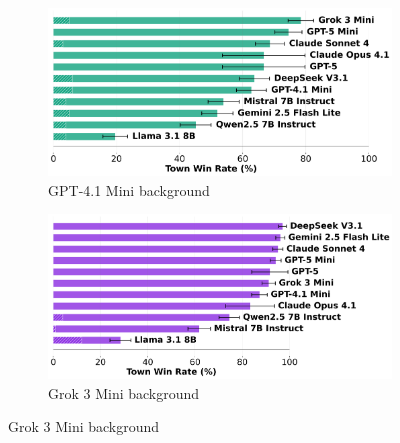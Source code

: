 \documentclass{article}
\begin{document}
\begin{figure}[htbp]
    \centering
    \begin{subfigure}[b]{0.48\textwidth}
        \centering
        \includegraphics[width=\textwidth]{../results/detective_gpt-4.1_mini_db_benchmark.png}
        \caption{GPT-4.1 Mini background}
        \label{fig:detective_gpt41mini_appendix}
    \end{subfigure}
    \hfill
    \begin{subfigure}[b]{0.48\textwidth}
        \centering
        \includegraphics[width=\textwidth]{../results/detective_grok_3_mini_db_benchmark.png}
        \caption{Grok 3 Mini background}
        \label{fig:detective_grok3_appendix}
    \end{subfigure}
    
    \vspace{0.5cm}
    

\end{figure}
\end{document}

